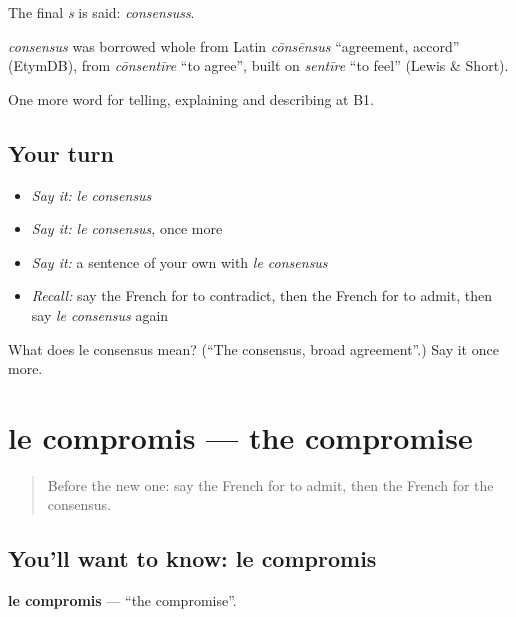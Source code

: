 The final \emph{s} is said: \emph{consensuss}.

\begin{cousinweb}
\emph{consensus} was borrowed whole from Latin \emph{cōnsēnsus} \textquotedblleft{}agreement, accord\textquotedblright{} (EtymDB), from \emph{cōnsentīre} \textquotedblleft{}to agree\textquotedblright{}, built on \emph{sentīre} \textquotedblleft{}to feel\textquotedblright{} (Lewis \& Short).
\end{cousinweb}

\begin{grammarlens}[title={What you've built}]
One more word for telling, explaining and describing at B1.
\end{grammarlens}

\subsection*{Your turn}
\begin{itemize}
\raggedright
  \item \emph{Say it:} \emph{le consensus}
  \item \emph{Say it:} \emph{le consensus}, once more
  \item \emph{Say it:} a sentence of your own with \emph{le consensus}
  \item \emph{Recall:} say the French for to contradict, then the French for to admit, then say \emph{le consensus} again
\end{itemize}

\begin{tcolorbox}[breakable,colback=teal!4,colframe=teal!35!black,title={Before you move on}]
What does le consensus mean? (\textquotedblleft{}The consensus, broad agreement\textquotedblright{}.) Say it once more.
\end{tcolorbox}
\section[le compromis]{le compromis — the compromise}

\label{lesson:FR-C337-compromis}



\begin{quote}
Before the new one: say the French for to admit, then the French for the consensus.
\end{quote}

\subsection*{You'll want to know: le compromis}
\textbf{le compromis} — \textquotedblleft{}the compromise\textquotedblright{}.

